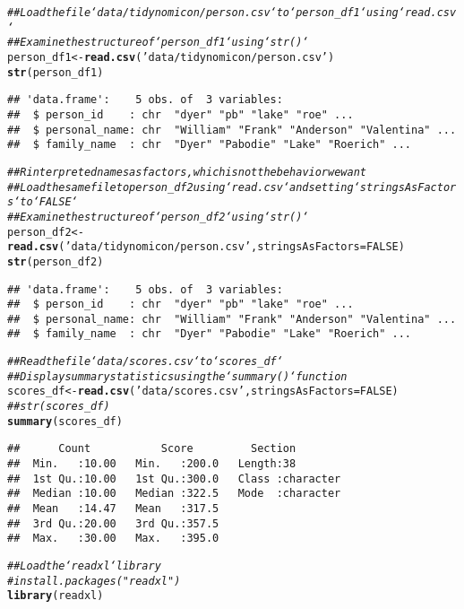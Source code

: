 \documentclass{article}\usepackage[]{graphicx}\usepackage[]{xcolor}
\makeatletter
\newcommand{\hlnum}[1]{\textcolor[rgb]{0.686,0.059,0.569}{#1}}%
\newcommand{\hlstr}[1]{\textcolor[rgb]{0.192,0.494,0.8}{#1}}%
\newcommand{\hlcom}[1]{\textcolor[rgb]{0.678,0.584,0.686}{\textit{#1}}}%
\newcommand{\hlstd}[1]{\textcolor[rgb]{0.345,0.345,0.345}{#1}}%
\newcommand{\hlkwb}[1]{\textcolor[rgb]{0.69,0.353,0.396}{#1}}%
\newcommand{\hlkwc}[1]{\textcolor[rgb]{0.333,0.667,0.333}{#1}}%
\newcommand{\hlkwd}[1]{\textcolor[rgb]{0.737,0.353,0.396}{\textbf{#1}}}%
\newenvironment{kframe}{%
 \def\at@end@of@kframe{}%
 \ifinner\ifhmode%
  \def\at@end@of@kframe{\end{minipage}}%
  \begin{minipage}{\columnwidth}%
 \fi\fi%
 \def\FrameCommand##1{\hskip\@totalleftmargin \hskip-\fboxsep
 \colorbox{shadecolor}{##1}\hskip-\fboxsep
     \hskip-\linewidth \hskip-\@totalleftmargin \hskip\columnwidth}%
 \MakeFramed {\advance\hsize-\width
   \@totalleftmargin\z@ \linewidth\hsize
   \@setminipage}}%
 {\par\unskip\endMakeFramed%
 \at@end@of@kframe}
\newenvironment{knitrout}{}{} %
\makeatother
\begin{document}
\begin{knitrout}
\begin{kframe}
\begin{alltt}
\hlcom{## Load the file `data/tidynomicon/person.csv` to `person_df1` using `read.csv`}
\hlcom{## Examine the structure of `person_df1` using `str()`}
\hlstd{person_df1} \hlkwb{<-} \hlkwd{read.csv}\hlstd{(}\hlstr{'data/tidynomicon/person.csv'}\hlstd{)}
\hlkwd{str}\hlstd{(person_df1)}
\end{alltt}
\begin{verbatim}
## 'data.frame':	5 obs. of  3 variables:
##  $ person_id    : chr  "dyer" "pb" "lake" "roe" ...
##  $ personal_name: chr  "William" "Frank" "Anderson" "Valentina" ...
##  $ family_name  : chr  "Dyer" "Pabodie" "Lake" "Roerich" ...
\end{verbatim}
\begin{alltt}
\hlcom{## R interpreted names as factors, which is not the behavior we want}
\hlcom{## Load the same file to person_df2 using `read.csv` and setting `stringsAsFactors` to `FALSE`}
\hlcom{## Examine the structure of `person_df2` using `str()`}
\hlstd{person_df2} \hlkwb{<-} \hlkwd{read.csv}\hlstd{(}\hlstr{'data/tidynomicon/person.csv'}\hlstd{,} \hlkwc{stringsAsFactors}\hlstd{=}\hlnum{FALSE}\hlstd{)}
\hlkwd{str}\hlstd{(person_df2)}
\end{alltt}
\begin{verbatim}
## 'data.frame':	5 obs. of  3 variables:
##  $ person_id    : chr  "dyer" "pb" "lake" "roe" ...
##  $ personal_name: chr  "William" "Frank" "Anderson" "Valentina" ...
##  $ family_name  : chr  "Dyer" "Pabodie" "Lake" "Roerich" ...
\end{verbatim}
\begin{alltt}
\hlcom{## Read the file `data/scores.csv` to `scores_df`}
\hlcom{## Display summary statistics using the `summary()` function}
\hlstd{scores_df} \hlkwb{<-} \hlkwd{read.csv}\hlstd{(}\hlstr{'data/scores.csv'}\hlstd{,} \hlkwc{stringsAsFactors}\hlstd{=}\hlnum{FALSE}\hlstd{)}
\hlcom{##str(scores_df)}
\hlkwd{summary}\hlstd{(scores_df)}
\end{alltt}
\begin{verbatim}
##      Count           Score         Section         
##  Min.   :10.00   Min.   :200.0   Length:38         
##  1st Qu.:10.00   1st Qu.:300.0   Class :character  
##  Median :10.00   Median :322.5   Mode  :character  
##  Mean   :14.47   Mean   :317.5                     
##  3rd Qu.:20.00   3rd Qu.:357.5                     
##  Max.   :30.00   Max.   :395.0
\end{verbatim}
\begin{alltt}
\hlcom{## Load the `readxl` library}
\hlcom{#install.packages("readxl")}
\hlkwd{library}\hlstd{(readxl)}


\end{alltt}
\end{kframe}
\end{knitrout}
\end{document}
